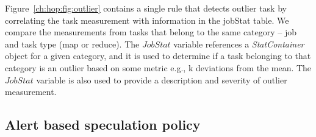 Figure~\ref{ch:hop:fig:outlier} contains a single rule that detects outlier task by correlating the
task measurement with information in the jobStat table. We compare the measurements from
tasks that belong to the same category -- job and task type (map or reduce). 
The $JobStat$ variable references a {\em StatContainer} object for a given category, and it
is used to determine if a task belonging to that category is an outlier based on some 
metric e.g., k deviations from the mean. The $JobStat$ variable is also used to provide a 
description and severity of outlier measurement. 

\subsection{Alert based speculation policy} 
\label{ch:hop:sec:speculation}

